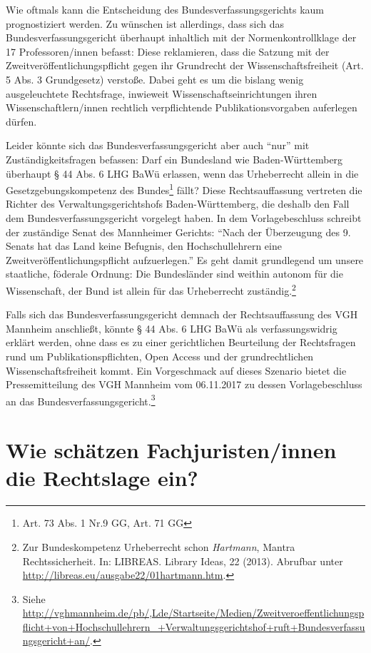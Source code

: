 \documentclass[a4paper,
fontsize=11pt,
oneside,
numbers=noperiodatend,
parskip=half-,
bibliography=totoc,
final
]{scrartcl}
\begin{document}
Wie oftmals kann die Entscheidung des Bundesverfassungsgerichts kaum
prognostiziert werden. Zu wünschen ist allerdings, dass sich das
Bundesverfassungsgericht überhaupt inhaltlich mit der
Normenkontrollklage der 17 Professoren/innen befasst: Diese reklamieren,
dass die Satzung mit der Zweit\-ver\-öffent\-lich\-ungs\-pflicht gegen ihr
Grundrecht der Wissenschaftsfreiheit (Art. 5 Abs. 3 Grundgesetz)
verstoße. Dabei geht es um die bislang wenig ausgeleuchtete Rechtsfrage,
inwieweit Wissenschaftseinrichtungen ihren Wissenschaftlern/innen
rechtlich verpflichtende Publikationsvorgaben auferlegen dürfen.

Leider könnte sich das Bundesverfassungsgericht aber auch \enquote{nur}
mit Zuständigkeitsfragen befassen: Darf ein Bundesland wie
Baden-Württemberg überhaupt § 44 Abs. 6 LHG BaWü erlassen, wenn das
Urheberrecht allein in die Gesetzgebungskompetenz des Bundes\footnote{Art.
  73 Abs. 1 Nr.9 GG, Art. 71 GG} fällt? Diese Rechtsauffassung vertreten
die Richter des Verwaltungsgerichtshofs Baden-Württemberg, die deshalb
den Fall dem Bundesverfassungsgericht vorgelegt haben. In dem
Vorlagebeschluss schreibt der zuständige Senat des Mannheimer Gerichts:
\enquote{Nach der Überzeugung des 9. Senats hat das Land keine Befugnis,
den Hochschullehrern eine Zweit\-ver\-öffent\-lich\-ungs\-pflicht aufzuerlegen.}
Es geht damit grundlegend um unsere staatliche, föderale Ordnung: Die
Bundesländer sind weithin autonom für die Wissenschaft, der Bund ist
allein für das Urheberrecht zuständig.\footnote{Zur Bundeskompetenz
  Urheberrecht schon \emph{Hartmann}, Mantra Rechtssicherheit. In:
  LIBREAS. Library Ideas, 22 (2013). Abrufbar unter
  \url{http://libreas.eu/ausgabe22/01hartmann.htm}.}

Falls sich das Bundesverfassungsgericht demnach der Rechtsauffassung des
VGH Mannheim anschließt, könnte § 44 Abs. 6 LHG BaWü als
verfassungswidrig erklärt werden, ohne dass es zu einer gerichtlichen
Beurteilung der Rechtsfragen rund um Publikationspflichten, Open Access
und der grundrechtlichen Wissenschaftsfreiheit kommt. Ein Vorgeschmack
auf dieses Szenario bietet die Pressemitteilung des VGH Mannheim vom
06.11.2017 zu dessen Vorlagebeschluss an das
Bundesverfassungsgericht.\footnote{Siehe
  \url{http://vghmannheim.de/pb/,Lde/Startseite/Medien/Zweitveroeffentlichungspflicht+von+Hochschullehrern_+Verwaltungsgerichtshof+ruft+Bundesverfassungsgericht+an/}.}

\hypertarget{wie-schuxe4tzen-fachjuristeninnen-die-rechtslage-ein}{%
\section*{Wie schätzen Fachjuristen/innen die Rechtslage
ein?}\label{wie-schuxe4tzen-fachjuristeninnen-die-rechtslage-ein}}
\end{document}
